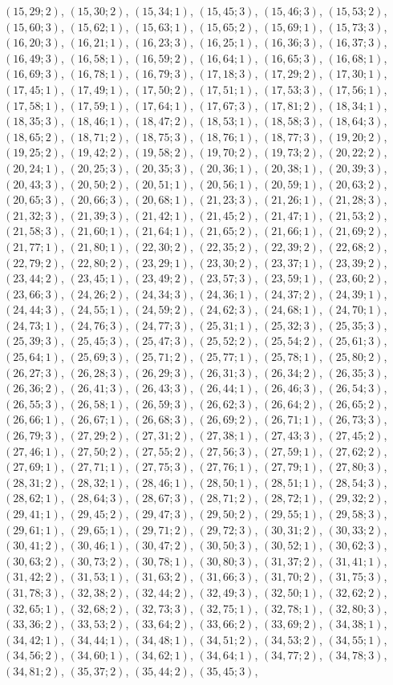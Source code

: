 \documentclass[11pt]{article}
\begin{document}
$(15,29;2)$, $(15,30;2)$, $(15,34;1)$, $(15,45;3)$, $(15,46;3)$, $(15,53;2)$, $(15,60;3)$, $(15,62;1)$, $(15,63;1)$, $(15,65;2)$, $(15,69;1)$, $(15,73;3)$, $(16,20;3)$, $(16,21;1)$, $(16,23;3)$, $(16,25;1)$, $(16,36;3)$, $(16,37;3)$, $(16,49;3)$, $(16,58;1)$, $(16,59;2)$, $(16,64;1)$, $(16,65;3)$, $(16,68;1)$, $(16,69;3)$, $(16,78;1)$, $(16,79;3)$, $(17,18;3)$, $(17,29;2)$, $(17,30;1)$, $(17,45;1)$, $(17,49;1)$, $(17,50;2)$, $(17,51;1)$, $(17,53;3)$, $(17,56;1)$, $(17,58;1)$, $(17,59;1)$, $(17,64;1)$, $(17,67;3)$, $(17,81;2)$, $(18,34;1)$, $(18,35;3)$, $(18,46;1)$, $(18,47;2)$, $(18,53;1)$, $(18,58;3)$, $(18,64;3)$, $(18,65;2)$, $(18,71;2)$, $(18,75;3)$, $(18,76;1)$, $(18,77;3)$, $(19,20;2)$, $(19,25;2)$, $(19,42;2)$, $(19,58;2)$, $(19,70;2)$, $(19,73;2)$, $(20,22;2)$, $(20,24;1)$, $(20,25;3)$, $(20,35;3)$, $(20,36;1)$, $(20,38;1)$, $(20,39;3)$, $(20,43;3)$, $(20,50;2)$, $(20,51;1)$, $(20,56;1)$, $(20,59;1)$, $(20,63;2)$, $(20,65;3)$, $(20,66;3)$, $(20,68;1)$, $(21,23;3)$, $(21,26;1)$, $(21,28;3)$, $(21,32;3)$, $(21,39;3)$, $(21,42;1)$, $(21,45;2)$, $(21,47;1)$, $(21,53;2)$, $(21,58;3)$, $(21,60;1)$, $(21,64;1)$, $(21,65;2)$, $(21,66;1)$, $(21,69;2)$, $(21,77;1)$, $(21,80;1)$, $(22,30;2)$, $(22,35;2)$, $(22,39;2)$, $(22,68;2)$, $(22,79;2)$, $(22,80;2)$, $(23,29;1)$, $(23,30;2)$, $(23,37;1)$, $(23,39;2)$, $(23,44;2)$, $(23,45;1)$, $(23,49;2)$, $(23,57;3)$, $(23,59;1)$, $(23,60;2)$, $(23,66;3)$, $(24,26;2)$, $(24,34;3)$, $(24,36;1)$, $(24,37;2)$, $(24,39;1)$, $(24,44;3)$, $(24,55;1)$, $(24,59;2)$, $(24,62;3)$, $(24,68;1)$, $(24,70;1)$, $(24,73;1)$, $(24,76;3)$, $(24,77;3)$, $(25,31;1)$, $(25,32;3)$, $(25,35;3)$, $(25,39;3)$, $(25,45;3)$, $(25,47;3)$, $(25,52;2)$, $(25,54;2)$, $(25,61;3)$, $(25,64;1)$, $(25,69;3)$, $(25,71;2)$, $(25,77;1)$, $(25,78;1)$, $(25,80;2)$, $(26,27;3)$, $(26,28;3)$, $(26,29;3)$, $(26,31;3)$, $(26,34;2)$, $(26,35;3)$, $(26,36;2)$, $(26,41;3)$, $(26,43;3)$, $(26,44;1)$, $(26,46;3)$, $(26,54;3)$, $(26,55;3)$, $(26,58;1)$, $(26,59;3)$, $(26,62;3)$, $(26,64;2)$, $(26,65;2)$, $(26,66;1)$, $(26,67;1)$, $(26,68;3)$, $(26,69;2)$, $(26,71;1)$, $(26,73;3)$, $(26,79;3)$, $(27,29;2)$, $(27,31;2)$, $(27,38;1)$, $(27,43;3)$, $(27,45;2)$, $(27,46;1)$, $(27,50;2)$, $(27,55;2)$, $(27,56;3)$, $(27,59;1)$, $(27,62;2)$, $(27,69;1)$, $(27,71;1)$, $(27,75;3)$, $(27,76;1)$, $(27,79;1)$, $(27,80;3)$, $(28,31;2)$, $(28,32;1)$, $(28,46;1)$, $(28,50;1)$, $(28,51;1)$, $(28,54;3)$, $(28,62;1)$, $(28,64;3)$, $(28,67;3)$, $(28,71;2)$, $(28,72;1)$, $(29,32;2)$, $(29,41;1)$, $(29,45;2)$, $(29,47;3)$, $(29,50;2)$, $(29,55;1)$, $(29,58;3)$, $(29,61;1)$, $(29,65;1)$, $(29,71;2)$, $(29,72;3)$, $(30,31;2)$, $(30,33;2)$, $(30,41;2)$, $(30,46;1)$, $(30,47;2)$, $(30,50;3)$, $(30,52;1)$, $(30,62;3)$, $(30,63;2)$, $(30,73;2)$, $(30,78;1)$, $(30,80;3)$, $(31,37;2)$, $(31,41;1)$, $(31,42;2)$, $(31,53;1)$, $(31,63;2)$, $(31,66;3)$, $(31,70;2)$, $(31,75;3)$, $(31,78;3)$, $(32,38;2)$, $(32,44;2)$, $(32,49;3)$, $(32,50;1)$, $(32,62;2)$, $(32,65;1)$, $(32,68;2)$, $(32,73;3)$, $(32,75;1)$, $(32,78;1)$, $(32,80;3)$, $(33,36;2)$, $(33,53;2)$, $(33,64;2)$, $(33,66;2)$, $(33,69;2)$, $(34,38;1)$, $(34,42;1)$, $(34,44;1)$, $(34,48;1)$, $(34,51;2)$, $(34,53;2)$, $(34,55;1)$, $(34,56;2)$, $(34,60;1)$, $(34,62;1)$, $(34,64;1)$, $(34,77;2)$, $(34,78;3)$, $(34,81;2)$, $(35,37;2)$, $(35,44;2)$, $(35,45;3)$, 
\end{document}

